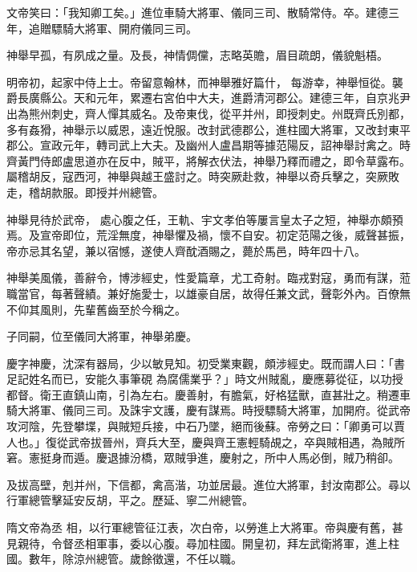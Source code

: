 \begin{pinyinscope}
 文帝笑曰：「我知卿工矣。」進位車騎大將軍、儀同三司、散騎常侍。卒。建德三年，追贈驃騎大將軍、開府儀同三司。



 神舉早孤，有夙成之量。及長，神情倜儻，志略英贍，眉目疏朗，儀貌魁梧。



 明帝初，起家中侍上士。帝留意翰林，而神舉雅好篇什，
 每游幸，神舉恒從。襲爵長廣縣公。天和元年，累遷右宮伯中大夫，進爵清河郡公。建德三年，自京兆尹出為熊州刺史，齊人憚其威名。及帝東伐，從平并州，即授刺史。州既齊氏別都，多有姦猾，神舉示以威恩，遠近悅服。改封武德郡公，進柱國大將軍，又改封東平郡公。宣政元年，轉司武上大夫。及幽州人盧昌期等據范陽反，詔神舉討禽之。時齊黃門侍郎盧思道亦在反中，賊平，將解衣伏法，神舉乃釋而禮之，即令草露布。屬稽胡反，寇西河，神舉與越王盛討之。時突厥赴救，神舉以奇兵擊之，突厥敗走，稽胡款服。即授并州總管。



 神舉見待於武帝，
 處心腹之任，王軌、宇文孝伯等屢言皇太子之短，神舉亦頗預焉。及宣帝即位，荒淫無度，神舉懼及禍，懷不自安。初定范陽之後，威聲甚振，帝亦忌其名望，兼以宿憾，遂使人齊酖酒賜之，薨於馬邑，時年四十八。



 神舉美風儀，善辭令，博涉經史，性愛篇章，尤工奇射。臨戎對寇，勇而有謀，蒞職當官，每著聲績。兼好施愛士，以雄豪自居，故得任兼文武，聲彰外內。百僚無不仰其風則，先輩舊齒至於今稱之。



 子同嗣，位至儀同大將軍，神舉弟慶。



 慶字神慶，沈深有器局，少以敏見知。初受業東觀，頗涉經史。既而謂人曰：「書足記姓名而已，安能久事筆硯
 為腐儒業乎？」時文州賊亂，慶應募從征，以功授都督。衛王直鎮山南，引為左右。慶善射，有膽氣，好格猛獸，直甚壯之。稍遷車騎大將軍、儀同三司。及誅宇文護，慶有謀焉。時授驃騎大將軍，加開府。從武帝攻河陰，先登攀堞，與賊短兵接，中石乃墜，絕而後蘇。帝勞之曰：「卿勇可以賈人也。」復從武帝拔晉州，齊兵大至，慶與齊王憲輕騎覘之，卒與賊相遇，為賊所窘。憲挺身而遁。慶退據汾橋，眾賊爭進，慶射之，所中人馬必倒，賊乃稍卻。



 及拔高壁，剋并州，下信都，禽高湝，功並居最。進位大將軍，封汝南郡公。尋以行軍總管擊延安反胡，平之。歷延、寧二州總管。



 隋文帝為丞
 相，以行軍總管征江表，次白帝，以勞進上大將軍。帝與慶有舊，甚見親待，令督丞相軍事，委以心腹。尋加柱國。開皇初，拜左武衛將軍，進上柱國。數年，除涼州總管。歲餘徵還，不任以職。




\end{pinyinscope}

